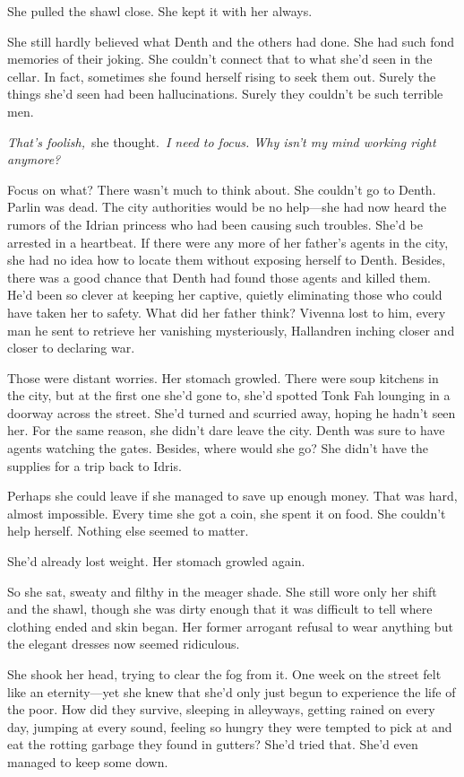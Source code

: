 She pulled the shawl close. She kept it with her always.

She still hardly believed what Denth and the others had done. She had such fond memories of their joking. She couldn’t connect that to what she’d seen in the cellar. In fact, sometimes she found herself rising to seek them out. Surely the things she’d seen had been hallucinations. Surely they couldn’t be such terrible men.

\textit{That’s foolish,}~she thought.~\textit{I need to focus. Why isn’t my mind working right anymore?}

Focus on what? There wasn’t much to think about. She couldn’t go to Denth. Parlin was dead. The city authorities would be no help—she had now heard the rumors of the Idrian princess who had been causing such troubles. She’d be arrested in a heartbeat. If there were any more of her father’s agents in the city, she had no idea how to locate them without exposing herself to Denth. Besides, there was a good chance that Denth had found those agents and killed them. He’d been so clever at keeping her captive, quietly eliminating those who could have taken her to safety. What did her father think? Vivenna lost to him, every man he sent to retrieve her vanishing mysteriously, Hallandren inching closer and closer to declaring war.

Those were distant worries. Her stomach growled. There were soup kitchens in the city, but at the first one she’d gone to, she’d spotted Tonk Fah lounging in a doorway across the street. She’d turned and scurried away, hoping he hadn’t seen her. For the same reason, she didn’t dare leave the city. Denth was sure to have agents watching the gates. Besides, where would she go? She didn’t have the supplies for a trip back to Idris.

Perhaps she could leave if she managed to save up enough money. That was hard, almost impossible. Every time she got a coin, she spent it on food. She couldn’t help herself. Nothing else seemed to matter.

She’d already lost weight. Her stomach growled again.

So she sat, sweaty and filthy in the meager shade. She still wore only her shift and the shawl, though she was dirty enough that it was difficult to tell where clothing ended and skin began. Her former arrogant refusal to wear anything but the elegant dresses now seemed ridiculous.

She shook her head, trying to clear the fog from it. One week on the street felt like an eternity—yet she knew that she’d only just begun to experience the life of the poor. How did they survive, sleeping in alleyways, getting rained on every day, jumping at every sound, feeling so hungry they were tempted to pick at and eat the rotting garbage they found in gutters? She’d tried that. She’d even managed to keep some down.

